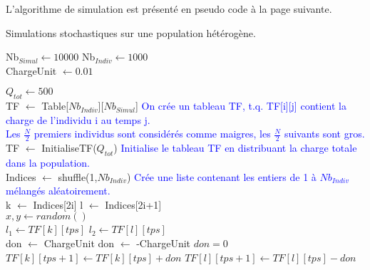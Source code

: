 L'algorithme de simulation est présenté en pseudo code à la page suivante. \\

\pagebreak

\begin{algorithm}
\caption{Simulations stochastiques sur une population hétérogène.}
\begin{algorithmic}

\State Nb$_{Simul} \gets 10000$
\State Nb$_{Indiv} \gets 1000$\\

\State ChargeUnit $\gets 0.01$

\State $Q_{tot} \gets 500$\\


\State TF $\gets$ Table[$Nb_{Indiv}$][$Nb_{Simul}$]
\State \textcolor{blue}{On crée un tableau TF, t.q. TF[i][j] contient la charge de l'individu i au temps j.\\
Les $\frac{N}{2}$ premiers individus sont considérés comme maigres, les $\frac{N}{2}$ suivants sont gros.}\\
\State TF $\gets$ InitialiseTF($Q_{tot}$)
\State \textcolor{blue}{Initialise le tableau TF en distribuant la charge totale dans la population.}\\

	\State Indices $\gets$ shuffle(1,$Nb_{Indiv}$) 
	\State \textcolor{blue}{Crée une liste contenant les entiers de 1 à $Nb_{Indiv}$ mélangés aléatoirement.}\\
		\State k $\gets$ Indices[2i]
		\State l $\gets$ Indices[2i+1] \\
		
		\State $x,y \gets random()$\\
		
		\State $l_1 \gets TF[k][tps]$
		\State $l_2 \gets TF[l][tps]$\\
		
			\State don $\gets$ ChargeUnit 
			\State don $\gets$ -ChargeUnit 
		\Else
			\State $don=0$
		\EndIf \\
		
		\State $TF[k][tps+1] \gets TF[k][tps]+don$
        \State $TF[l][tps+1] \gets TF[l][tps]-don$\\
	\EndFor
\EndFor



\end{algorithmic}
\end{algorithm}

